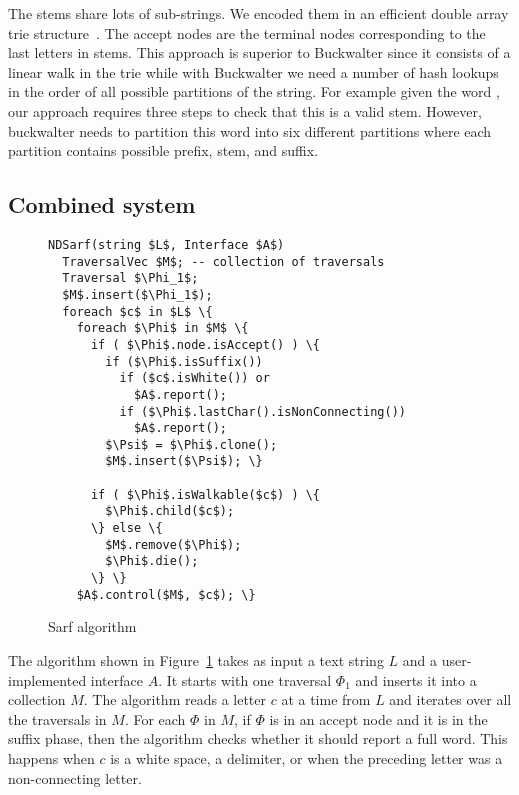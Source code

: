 The stems share lots of sub-strings. We encoded them in
an efficient double array trie structure~\citep{Aoe:89}. 
The accept nodes are the terminal nodes corresponding to the last 
letters in stems. 
This approach is superior to Buckwalter since it consists of
a linear walk in the trie while with Buckwalter we need 
a number of hash lookups in the order of all possible partitions
of the string. 
For example given the word , our approach requires three 
steps to check that this is a valid stem. 
However, buckwalter needs to partition this word into six different partitions 
where each partition contains possible prefix, stem, and suffix.

\subsection{Combined system}

\begin{figure}
\begin{minipage}{0.6\textwidth}
\begin{Verbatim}[fontsize=\relsize{-2},
frame=topline,framesep=4mm,label=\fbox{NDSarf algorithm},
commandchars=\\\{\}, codes={\catcode`$=3\catcode`_=8}]
NDSarf(string $L$, Interface $A$) 
  TraversalVec $M$; -- collection of traversals
  Traversal $\Phi_1$;
  $M$.insert($\Phi_1$);
  foreach $c$ in $L$ \{
    foreach $\Phi$ in $M$ \{
      if ( $\Phi$.node.isAccept() ) \{
        if ($\Phi$.isSuffix())
          if ($c$.isWhite()) or 
            $A$.report();
          if ($\Phi$.lastChar().isNonConnecting())
            $A$.report();
        $\Psi$ = $\Phi$.clone();
        $M$.insert($\Psi$); \}

      if ( $\Phi$.isWalkable($c$) ) \{
        $\Phi$.child($c$);
      \} else \{
        $M$.remove($\Phi$);
        $\Phi$.die();
      \} \} 
    $A$.control($M$, $c$); \}
\end{Verbatim}
\end{minipage}
\caption{Sarf algorithm}
\label{f:ndsarf}
\end{figure}

The algorithm  shown in Figure~\ref{f:ndsarf}
takes as input a text string $L$ and a user-implemented interface
$A$. 
It starts with one traversal $\Phi_1$ and inserts it into a collection $M$. 
The algorithm reads a letter $c$ at a time from $L$
and iterates over all the traversals in $M$. 
For each $\Phi$ in $M$, 
if $\Phi$ is in an accept node and it is in the suffix
phase, then the algorithm checks whether it should report
a full word. 
This happens when $c$ is a white space, a delimiter, 
or when the preceding letter %
was a non-connecting letter. 

